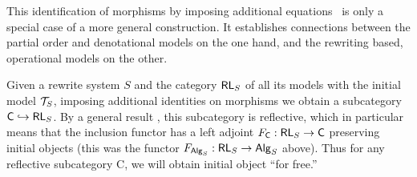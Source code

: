{This identification of morphisms by imposing additional
equations~ is only a special case of a more general
construction. It establishes connections between the partial order and
denotational models on the one hand, and the rewriting based,
operational models on the other.

Given a rewrite system $S$ and the category ${\sf RL}_S$ of
all its models with the initial model ${\cal T}_{S}$, imposing additional
identities on morphisms we obtain a subcategory ${\sf
C} \mathrel{\hookrightarrow} {\sf RL}_S$. By a general result
\cite{c:BarT}, this subcategory is reflective, which in particular means that the inclusion
functor has a left adjoint $F_{{\sf C}}: {\sf RL}_S \mathrel{\rightarrow} {\sf C}$
preserving initial objects (this was the functor $F_{{\sf Alg}_{S}}:{\sf RL}_S\mathrel{\rightarrow} {\sf Alg}_S$
above). Thus for any reflective subcategory {\sf C}, we will obtain
initial object ``for free.''

}
